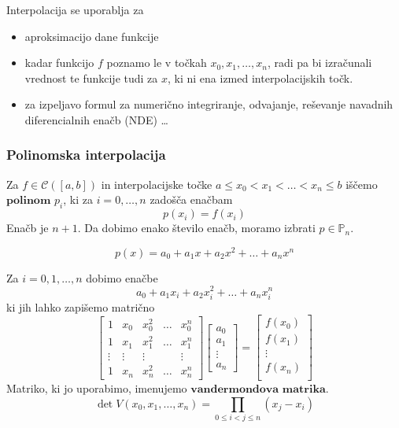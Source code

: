 \documentclass[a4paper,12pt]{article}
\theoremstyle{definition}
\theoremstyle{remark}
\newcommand{\Pp}{\mathbb{P}}
\begin{document}
Interpolacija se uporablja za
\begin{itemize}
    \item aproksimacijo dane funkcije
    \item kadar funkcijo $f$ poznamo le v točkah $x_0, x_1, \dots, x_n$, radi pa bi izračunali vrednost te funkcije tudi za $x$, ki ni ena izmed interpolacijskih točk.
    \item za izpeljavo formul za numerično integriranje, odvajanje, reševanje navadnih diferencialnih enačb (NDE) \dots
\end{itemize}

\subsubsection{Polinomska interpolacija}
Za $f \in \mathscr{C}([a, b])$ in interpolacijske točke $a \leq x_0 < x_1 < \dots < x_n \leq b$ iščemo $\textbf{polinom}$ $p_i$, ki za $i = 0, \dots, n$ zadošča enačbam
\begin{equation*}
    p(x_i) = f(x_i)
\end{equation*}
Enačb je $n+1$. Da dobimo enako število enačb, moramo izbrati $p \in \Pp_n$.

\begin{equation*}
    p(x) = a_0 + a_1 x + a_2 x^2 + \dots + a_n x^n
\end{equation*}

Za  $i = 0, 1, \dots, n$ dobimo enačbe
\begin{equation*}
    a_0 + a_1 x_i + a_2 x_i^2 + \dots + a_n x_i^n
\end{equation*}
ki jih lahko zapišemo matrično
\begin{equation*}
    \begin{bmatrix}
        1 & x_0 & x_0^2 & \dots & x_0^n \\
        1 & x_1 & x_1^2 & \dots & x_1^n \\
    \vdots & \vdots & \vdots &  & \vdots \\
        1 & x_n & x_n^2 & \dots & x_n^n 
    \end{bmatrix}
    \begin{bmatrix}
        a_0 \\
        a_1 \\
        \vdots \\
        a_n
    \end{bmatrix}
    =
    \begin{bmatrix}
        f(x_0) \\
        f(x_1) \\
        \vdots \\
        f(x_n) \\
    \end{bmatrix}
\end{equation*}
Matriko, ki jo uporabimo, imenujemo $\textbf{vandermondova matrika}$.
\begin{equation*}
    \det V(x_0, x_1, \dots, x_n) = \prod_{0 \leq i < j \leq n} (x_j - x_i)
\end{equation*}
\end{document}

